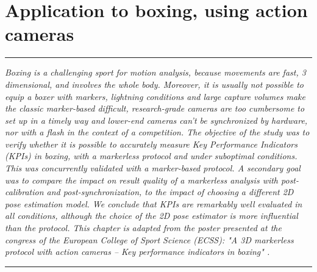 
\lhead[\fancyplain{}{\leftmark}]%
      {\fancyplain{}{}} %
\chead[\fancyplain{}{}]%
      {\fancyplain{}{}}
\rhead[\fancyplain{}{}]%
      {\fancyplain{}{\rightmark}}%
\lfoot[\fancyplain{}{}]%
      {\fancyplain{}{}}
\cfoot[\fancyplain{}{\thepage}]%
      {\fancyplain{}{\thepage}} %
\rfoot[\fancyplain{}{}]%
     {\fancyplain{}{\scriptsize}}



\chapter{Application to boxing, using action cameras}
\label{ch:6}


\begin{center}
\rule{0.7\linewidth}{.5pt}
\begin{minipage}{0.7\linewidth}
\smallskip

\textit{Boxing is a challenging sport for motion analysis, because movements are fast, 3 dimensional, and involves the whole body. Moreover, it is usually not possible to equip a boxer with markers, lightning conditions and large capture volumes make the classic marker-based difficult, research-grade cameras are too cumbersome to set up in a timely way and lower-end cameras can't be synchronized by hardware, nor with a flash in the context of a competition.\newline\newline
The objective of the study was to verify whether it is possible to accurately measure Key Performance Indicators (KPIs) in boxing, with a markerless protocol and under suboptimal conditions. This was concurrently validated with a marker-based protocol. A secondary goal was to compare the impact on result quality of a markerless analysis with post-calibration and post-synchronization, to the impact of choosing a different 2D pose estimation model. We conclude that KPIs are remarkably well evaluated in all conditions, although the choice of the 2D pose estimator is more influential than the protocol. \newline \newline
This chapter is adapted from the poster presented at the congress of the European College of Sport Science (ECSS): "A 3D markerless protocol with action cameras – Key performance indicators in boxing" \cite{Pagnon2022c}.
}

\end{minipage}
\smallskip
\rule{0.7\linewidth}{.5pt}
\end{center}

